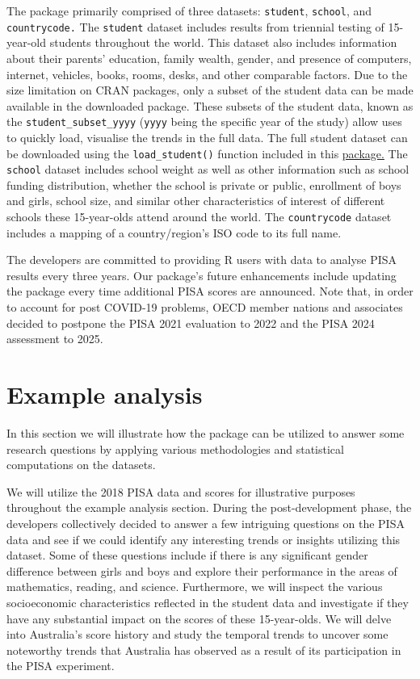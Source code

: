 The  package primarily comprised of three datasets: \texttt{student}, \texttt{school}, and \texttt{countrycode.} The \texttt{student} dataset includes results from triennial testing of 15-year-old students throughout the world. This dataset also includes information about their parents' education, family wealth, gender, and presence of computers, internet, vehicles, books, rooms, desks, and other comparable factors. Due to the size limitation on CRAN packages, only a subset of the student data can be made available in the downloaded package. These subsets of the student data, known as the \texttt{student\_subset\_yyyy} (\texttt{yyyy} being the specific year of the study) allow uses to quickly load, visualise the trends in the full data. The full student dataset can be downloaded using the \texttt{load\_student()} function included in this \href{https://kevinwang09.github.io/learningtower/}{package.} The \texttt{school} dataset includes school weight as well as other information such as school funding distribution, whether the school is private or public, enrollment of boys and girls, school size, and similar other characteristics of interest of different schools these 15-year-olds attend around the world. The \texttt{countrycode} dataset includes a mapping of a country/region's ISO code to its full name.

The  developers are committed to providing R users with data to analyse PISA results every three years. Our package's future enhancements include updating the package every time additional PISA scores are announced. Note that, in order to account for post COVID-19 problems, OECD member nations and associates decided to postpone the PISA 2021 evaluation to 2022 and the PISA 2024 assessment to 2025.

\section{Example analysis}\label{example-analysis}

In this section we will illustrate how the  package can be utilized to answer some research questions by applying various methodologies and statistical computations on the  datasets.

We will utilize the 2018 PISA data and scores for illustrative purposes throughout the example analysis section. During the post-development phase, the  developers collectively decided to answer a few intriguing questions on the PISA data and see if we could identify any interesting trends or insights utilizing this dataset. Some of these questions include if there is any significant gender difference between girls and boys and explore their performance in the areas of mathematics, reading, and science. Furthermore, we will inspect the various socioeconomic characteristics reflected in the student data and investigate if they have any substantial impact on the scores of these 15-year-olds. We will delve into Australia's score history and study the temporal trends to uncover some noteworthy trends that Australia has observed as a result of its participation in the PISA experiment.

